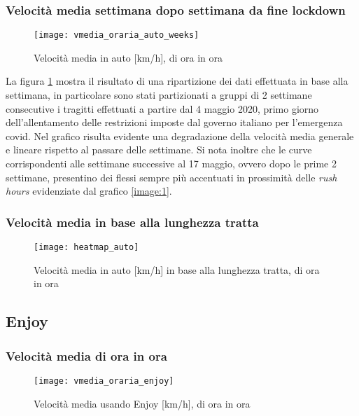 \subsubsection{Velocità media settimana dopo settimana da fine lockdown}

\begin{figure}[!h]
	\texttt{[image: vmedia\_oraria\_auto\_weeks]}
	\caption{Velocità media in auto [km/h], di ora in ora}
	\label{image:3}
\end{figure}

La figura \ref{image:3} mostra il risultato di una ripartizione dei dati effettuata in base alla settimana, in particolare sono stati partizionati a gruppi di 2 settimane consecutive i tragitti effettuati a partire dal 4 maggio 2020, primo giorno dell'allentamento delle restrizioni imposte dal governo italiano per l'emergenza covid\cite{dpcm26aprile}. Nel grafico risulta evidente una degradazione della velocità media generale e lineare rispetto al passare delle settimane. Si nota inoltre che le curve corrispondenti alle settimane successive al 17 maggio, ovvero dopo le prime 2 settimane, presentino dei flessi sempre più accentuati in prossimità delle \textit{rush hours} evidenziate dal grafico \ref{image:1}.

\subsubsection{Velocità media in base alla lunghezza tratta}

\begin{center}
\begin{figure}
	\texttt{[image: heatmap\_auto]}
	\caption{Velocità media in auto [km/h] in base alla lunghezza tratta, di ora in ora}
	\label{image:12}
\end{figure}
\end{center}


\subsection{Enjoy}

\subsubsection{Velocità media di ora in ora}

\begin{figure}[H]
	\texttt{[image: vmedia\_oraria\_enjoy]}
	\caption{Velocità media usando Enjoy [km/h], di ora in ora}
	\label{image:4}
\end{figure}

